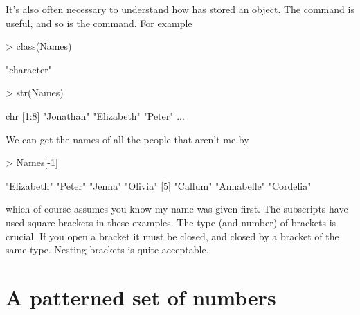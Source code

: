 It's also often necessary to understand how \R{} has stored an object. The  command is useful, and so is the  command. For example 
\begin{Schunk}
\begin{Sinput}
> class(Names) 
\end{Sinput}
\begin{Soutput}
[1] "character"
\end{Soutput}
\begin{Sinput}
> str(Names) 
\end{Sinput}
\begin{Soutput}
 chr [1:8] "Jonathan" "Elizabeth" "Peter" ...
\end{Soutput}
\end{Schunk}
We can get the names of all the people that aren't me by 
\begin{Schunk}
\begin{Sinput}
> Names[-1] 
\end{Sinput}
\begin{Soutput}
[1] "Elizabeth" "Peter"     "Jenna"     "Olivia"   
[5] "Callum"    "Annabelle" "Cordelia" 
\end{Soutput}
\end{Schunk}
which of course assumes you know my name was given first. The subscripts have used square brackets in these examples. The type (and number) of brackets is crucial. If you open a bracket it must be closed, and closed by a bracket of the same type. Nesting brackets is quite acceptable. 
 
 
\section{A patterned set of numbers} 
 
